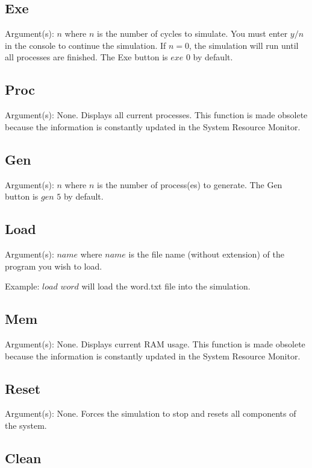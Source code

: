 \documentclass[10pt]{article}
\begin{document}
\subsection{Exe}

Argument(s): $n$ where $n$ is the number of cycles to simulate. You must enter $y/n$ in the console to continue the simulation.
If $n = 0$, the simulation will run until all processes are finished. The Exe button is $exe$ $0$ by default.

\subsection{Proc}

Argument(s): None. Displays all current processes.
This function is made obsolete because the information is constantly updated in the System Resource Monitor.

\subsection{Gen}

Argument(s): $n$ where $n$ is the number of process(es) to generate. The Gen button is $gen$ $5$ by default.

\subsection{Load}

Argument(s): $name$ where $name$ is the file name (without extension) of the program you wish to load.

Example: $load$ $word$ will load the word.txt file into the simulation.

\subsection{Mem}

Argument(s): None. Displays current RAM usage.
This function is made obsolete because the information is constantly updated in the System Resource Monitor.

\subsection{Reset}

Argument(s): None. Forces the simulation to stop and resets all components of the system.

\subsection{Clean}
\end{document}
